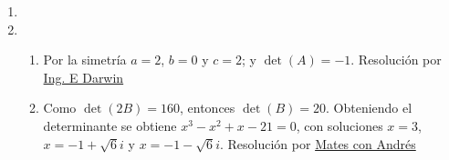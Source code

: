 \documentclass[a4paper]{article}
\newcommand{\exercise}{\item}
\begin{document}
\begin{enumerate}
\begin{enumerate} [label=(\alph*)]
		\item $\det(M^{Rot}_{\alpha})=\begin{vmatrix} \cos(\alpha) & -\sin(\alpha) \\ \sin(\alpha) & \cos(\alpha) \end{vmatrix}=\cos^2(\alpha)+\sin^2(\alpha)=1$.
		\item $\det(M^{Ciz}_x)=\begin{vmatrix} 1 & k \\ 0 & 1 \end{vmatrix}=1$.  \\ $\det(M^{Ciz}_y)=\begin{vmatrix} 1 & 0 \\ k & 1 \end{vmatrix}=1$.
		\item $\det(M^{C/E}_x)=\begin{vmatrix} k & 1 \\ 0 & 1 \end{vmatrix}=k$.  \\ $\det(M^{C/E}_y)=\begin{vmatrix} 1 & 0 \\ 0 & k \end{vmatrix}=k$.
\end{enumerate}\exercise\begin{enumerate} [label=(\alph*)]		\item $\det(A^{-1})=\displaystyle{}\frac{1}{\det(A)}}=\frac{1}{5}$.
		\item $\det[(A.B)^T]=\det(A.B)=\det(A).\det(B)=5.(-2)=-10$.
		\item $\det(A+B)=\begin{vmatrix} 3 & 1 & -1 \\ -1 & 6 & 8 \\ -1 & -3 & 0 \end{vmatrix}=55$ (no hay propiedades utiles para aplicar).  
		\item $\det(2.A^4)=2^3.\det(A^4)=8.\det(A)^4=8.5^4=5000$.
		\item $\det(-k.B^n)=(-k)^3.\det(B^n)=-k^3.\det(B)^n=-k^3.(-2)^n$.
		\item $\det\left((A^T.B^{-1})^2\right)=\det(A^T.B^{-1})^2=\left(\det(A^T).\det(B^{-1})\right)^2=\left(\det(A).\displaystyle{\frac{1}{\det(B)}}\right)^2=\left(\frac{5}{-2}\right)^2=\frac{25}{4}$.
\end{enumerate}\exercise\begin{enumerate} [label=(\alph*)]		\item Por la simetría $a=2$, $b=0$ y $c=2$; y $\det(A)=-1$. Resolución por \href{https://youtu.be/FhKTUHGGyhk}{Ing. E Darwin}
		\item Como $\det(2B)=160$, entonces $\det(B)=20$. Obteniendo el determinante se obtiene $x^3-x^2+x-21=0$, con soluciones $x=3$, $x=-1+\sqrt{6}i$ y $x=-1-\sqrt{6}i$. Resolución por \href{https://youtu.be/ysZg6eVeoSY}{Mates con Andrés}
\end{enumerate}\end{enumerate}
\end{document}
